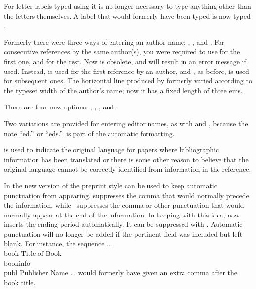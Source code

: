 For letter labels typed using  it is no longer necessary to
type anything other than the letters themselves.  A label that would
formerly have been typed 
is now typed .

Formerly there were three ways of entering an author name:
, , and .  For consecutive references by
the same author(s), you were required to use  for the first one,
and  for the rest.  Now  is obsolete, and will
result in an error message if used.  Instead,  is used for the first
reference by an author, and , as before, is used for subsequent
ones.  The horizontal line produced by  formerly varied
according to the typeset width of the author's name; now it has a fixed
length of three ems.

There are four new options: , , ,
and .

Two variations are provided for entering editor names, as with 
and , because the note ``ed.''\ or ``eds.''\ is part of the
automatic formatting.

 is used to indicate the original language for papers where
bibliographic information has been translated or there is some other reason
to believe that the original language cannot be correctly identified from
information in the reference.

In the new version of the preprint style
 can be used to keep automatic punctuation
from appearing.   suppresses the comma that would
normally precede the  information, while
\ suppresses the comma or other punctuation
that would normally appear at the end of the  information. 
In keeping with this idea,  now inserts the ending period
automatically.  It can be suppressed with .
Automatic punctuation will no longer be added if the pertinent field was
included but left blank.  For instance, the sequence
\beginexample{}
...
\\book Title of Book
\\bookinfo
\\publ Publisher Name
...
\endexample
\noindent
would formerly have given an extra comma after the book title.

